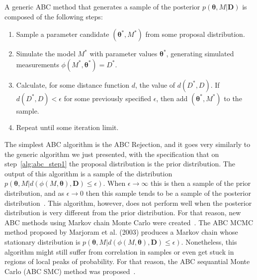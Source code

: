 A generic ABC method that generates a sample of the posterior 
$p ({\bm \theta}, M | {\bm D})$ is composed of the following steps:
\begin{enumerate}
    \item{Sample a parameter candidate $({\bm \theta}^*, M^*)$ from some 
        proposal distribution.} \label{alg:abc_step1}
    \item{Simulate the model $M^*$ with parameter values ${\bm
        \theta}^*$, generating simulated measurements $\phi (M^*,
        {\bm \theta}^*) = D^*$.}
    \item{Calculate, for some distance function $d$, the value of
        $d (D^*, D)$. If $d (D^*, D) < \epsilon$ for some previously
        specified $\epsilon$, then add $({\bm \theta}^*, M^*)$ to the
        sample.}
    \item{Repeat until some iteration limit.}
\end{enumerate}

The simplest ABC algorithm is the ABC Rejection, and it goes very 
similarly to the generic algorithm we just presented, with the 
specification that on step~\ref{alg:abc_step1} the proposal distribution
is the prior distribution. The output of this algorithm is a sample of 
the distribution $p ({\bm \theta}, M| d (\phi (M, {\bm \theta}), {\bm
D}) \leq \epsilon)$. When $\epsilon \to \infty$ this is then a sample of
the prior distribution, and as $\epsilon \to 0$ then this sample tends 
to be a sample of the posterior distribution~\cite{Pritchard1999}. This 
algorithm, however, does not perform well when the posterior 
distribution is very different from the prior distribution. For that 
reason, new ABC methods using Markov chain Monte Carlo were 
created~\cite{Marjoram2003}. The ABC MCMC method proposed by Marjoram et 
al. (2003) produces a Markov chain whose stationary distribution is
$p ({\bm \theta}, M | d (\phi (M, {\bm \theta}), {\bm D}) \leq
\epsilon)$. Nonetheless, this algorithm might still suffer from
correlation in samples or even get stuck in regions of local peaks of
probability. For that reason, the ABC sequantial Monte Carlo (ABC
SMC) method was proposed~\cite{Toni2009}.

